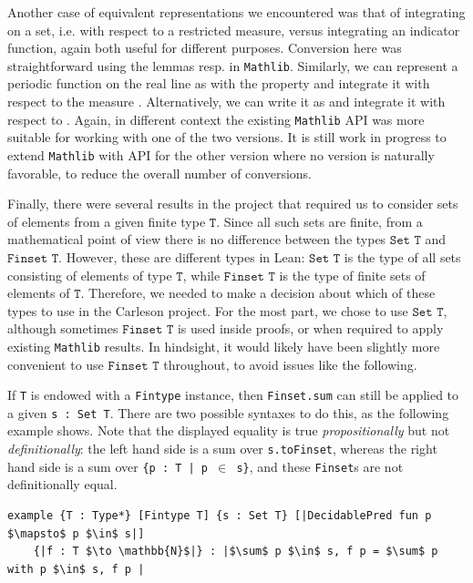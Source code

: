 \documentclass[12pt]{amsart}
\newcommand{\mathlib}{\texttt{Mathlib}\xspace}
\theoremstyle{definition}
\theoremstyle{plain}
\begin{document}
Another case of equivalent representations we encountered was that of integrating on a set, i.e. with respect to a restricted measure, versus integrating an indicator function, again both useful for different purposes. Conversion here was straightforward using the lemmas  resp.  in \mathlib.
Similarly, we can represent a periodic function on the real line as  with the property  and integrate it with respect to the measure . Alternatively, we can write it as  and integrate it with respect to .
Again, in different context the existing \mathlib API was more suitable for working with one of the two versions. It is still work in progress to extend \mathlib with API for the other version where no version is naturally favorable, to reduce the overall number of conversions.

Finally, there were several results in the project that required us to consider sets of elements from a given finite type $\texttt{T}$. Since all such sets are finite, from a mathematical point of view there is no difference between the types $\texttt{Set T}$ and $\texttt{Finset T}$.
However, these are different types in Lean: $\texttt{Set T}$ is the type of all sets consisting of elements of type $\texttt{T}$, while $\texttt{Finset T}$ is the type of finite sets of elements of $\texttt{T}$. Therefore, we needed to make a decision about which of these types to use in the Carleson project. For the most part, we chose to use $\texttt{Set T}$, although sometimes $\texttt{Finset T}$ is used inside proofs, or when required to apply existing \mathlib results. In hindsight, it would likely have been slightly more convenient to use $\texttt{Finset T}$ throughout, to avoid issues like the following.

If \texttt{T} is endowed with a \texttt{Fintype} instance, then \texttt{Finset.sum} can still be applied to a given \texttt{s : Set T}. There are two possible syntaxes to do this, as the following example shows. Note that the displayed equality is true \emph{propositionally} but not \emph{definitionally}: the left hand side is a sum over \texttt{s.toFinset}, whereas the right hand side is a sum over \texttt{\{p : T | p $\in$ s\}}, and these \texttt{Finset}s are not definitionally equal.

\begin{verbatim}
example {T : Type*} [Fintype T] {s : Set T} [|DecidablePred fun p $\mapsto$ p $\in$ s|]
    {|f : T $\to \mathbb{N}$|} : |$\sum$ p $\in$ s, f p = $\sum$ p with p $\in$ s, f p |
\end{verbatim}
\end{document}
